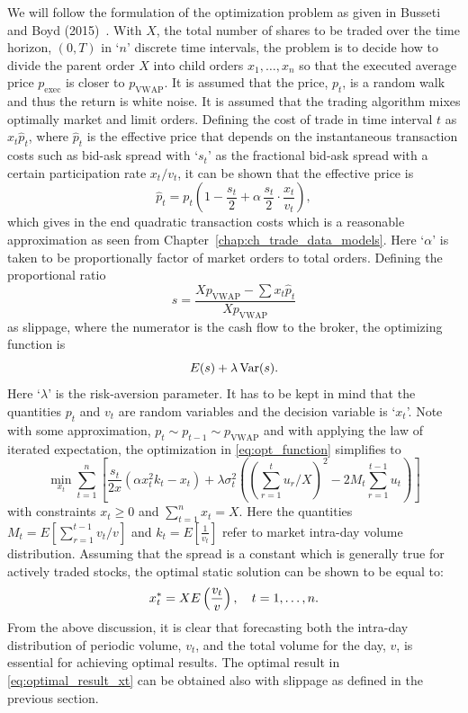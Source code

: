 We will follow the formulation of the optimization problem as given in Busseti and Boyd (2015)~\cite{busseli_boyd}. With $X$, the total number of shares to be traded over the time horizon, $(0,T)$ in `$n$' discrete time intervals, the problem is to decide how to divide the parent order $X$ into child orders $x_1, \ldots, x_n$ so that the executed average price $p_{\text{exec}}$ is closer to $p_{\text{VWAP}}$. It is assumed that the price, $p_t$, is a random walk and thus the return is white noise. It is assumed that the trading algorithm mixes optimally market and limit orders. Defining the cost of trade in time interval $t$ as $x_t \hat{p}_t$, where $\hat{p}_t$ is the effective price that depends on the instantaneous transaction costs such as bid-ask spread with `$s_t$' as the fractional bid-ask spread with a certain participation rate $x_t/v_t$, it can be shown that the effective price is
	\begin{equation}
	\hat{p}_t= p_t \left(1 - \dfrac{s_t}{2} + \alpha \, \dfrac{s_t}{2} \cdot \dfrac{x_t}{v_t} \right),
	\end{equation}
which gives in the end quadratic transaction costs which is a reasonable approximation as seen from Chapter~\ref{chap:ch_trade_data_models}. Here `$\alpha$' is taken to be proportionally factor of market orders to total orders. Defining the proportional ratio
	\begin{equation}
	s= \dfrac{X p_{\text{VWAP}} - \sum x_t \hat{p}_t}{X p_{\text{VWAP}}}
	\end{equation}
as slippage, where the numerator is the cash flow to the broker, the optimizing function is
	\begin{equation} \label{eq:opt_function}
	E(s) + \lambda \var(s).
	\end{equation}
Here `$\lambda$' is the risk-aversion parameter. It has to be kept in mind that the quantities $p_t$ and $v_t$ are random variables and the decision variable is `$x_t$'. Note with some approximation, $p_t \sim p_{t-1} \sim p_{\text{VWAP}}$ and with applying the law of iterated expectation, the optimization in \eqref{eq:opt_function} simplifies to
	\begin{equation}
	\min_{x_t} \sum_{t=1}^n \left[ \dfrac{s_t}{2x} (\alpha x_t^2 k_t - x_t) + \lambda \sigma_t^2 \left( \left( \sum_{r=1}^t u_r/X \right)^2 - 2 M_t \sum_{r=1}^{t-1} u_t \right) \right]
	\end{equation}
with constraints $x_t \geq 0$ and $\sum_{t=1}^n x_t = X$. Here the quantities $M_t= E \left[ \sum_{r=1}^{t-1} v_t/v\right]$ and $k_t= E[\frac{1}{v_t}]$ refer to market intra-day volume distribution. Assuming that the spread is a constant which is generally true for actively traded stocks, the optimal static solution can be shown to be equal to:
	\begin{equation} \label{eq:optimal_result_xt}
	x_t^*= X E\left(\dfrac{v_t}{v}\right), \enskip\enskip t=1,\ldots,n.
	\end{equation}
From the above discussion, it is clear that forecasting both the intra-day distribution of periodic volume, $v_t$, and the total volume for the day, $v$, is essential for achieving optimal results. The optimal result in \eqref{eq:optimal_result_xt} can be obtained also with slippage as defined in the previous section. \twomedskip


